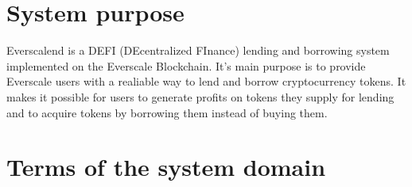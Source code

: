 

\section{System purpose}

Everscalend is a DEFI (DEcentralized FInance) lending and borrowing system implemented on the Everscale Blockchain. It's main purpose is to provide Everscale users with a realiable way to lend and borrow cryptocurrency tokens. It makes it possible for users to generate profits on tokens they supply for lending and to acquire tokens by borrowing them instead of buying them.

\section{Terms of the system domain}

